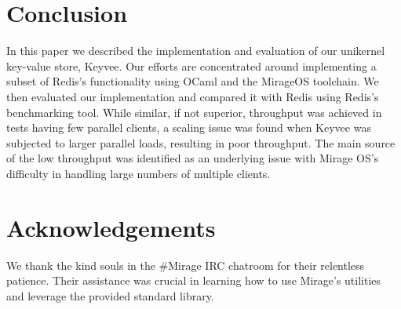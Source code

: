 \documentclass[english,10pt,twocolumn]{article}
\begin{document}
\section{Conclusion}
In this paper we described the implementation and evaluation of our unikernel key-value store, Keyvee.
Our efforts are concentrated around implementing a subset of Redis's functionality using OCaml and the MirageOS toolchain.
We then evaluated our implementation and compared it with Redis using Redis's benchmarking tool.
While similar, if not superior, throughput was achieved in tests having few parallel clients, a scaling issue was found when Keyvee was subjected to larger parallel loads, resulting in poor throughput.
The main source of the low throughput was identified as an underlying issue with Mirage OS's difficulty in handling large numbers of multiple clients.

\section{Acknowledgements}
We thank the kind souls in the \#Mirage IRC chatroom for their relentless patience.
Their assistance was crucial in learning how to use Mirage's utilities and leverage the provided standard library.





\end{document}
